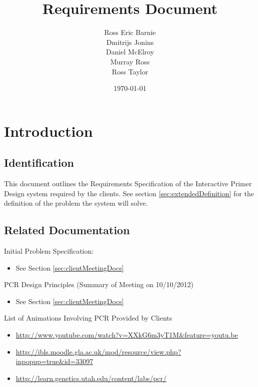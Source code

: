 \documentclass{l3deliverable}
\title{Requirements Document}
\author{Ross Eric Barnie \\
        Dmitrijs Jonins \\
        Daniel McElroy \\
        Murray Ross \\
        Ross Taylor
      }
\date{\today}
\begin{document}

\maketitle

\tableofcontents

\newpage


\section{Introduction}

\subsection{Identification}

This document outlines the Requirements Specification of the
Interactive Primer Design system required by the clients. See section
\ref{sec:extendedDefinition} for the definition of the problem the
system will solve.

\subsection{Related Documentation}


Initial Problem Specification:
\begin{itemize}
\item{See Section \ref{sec:clientMeetingDocs}} %
\end{itemize}

PCR Design Principles (Summary of Meeting on 10/10/2012)
\begin{itemize}
\item{See Section \ref{sec:clientMeetingDocs}} 
\end{itemize}

List of Animations Involving PCR Provided by Clients
\begin{itemize}
\item{\url{http://www.youtube.com/watch?v=XXkG6m3yT1M&feature=youtu.be}}
\item{\url{http://ibls.moodle.gla.ac.uk/mod/resource/view.php?inpopup=true&id=33097}}
\item{\url{http://learn.genetics.utah.edu/content/labs/pcr/}}
\end{itemize}
\end{document}
